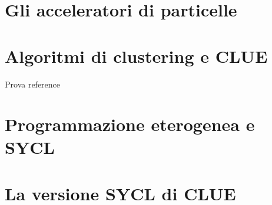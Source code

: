 \documentclass[12pt,a4paper]{report}
\begin{document}
\chapter{Gli acceleratori di particelle}


\chapter{Algoritmi di clustering e CLUE}
Prova reference\cite{CLUE}

\chapter{Programmazione eterogenea e SYCL}

\chapter{La versione SYCL di CLUE}



\end{document}

